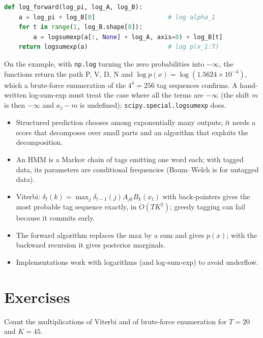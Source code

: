 \begin{notechapter}
\begin{lstlisting}[language=Python]
def log_forward(log_pi, log_A, log_B):
    a = log_pi + log_B[0]                    # log alpha_1
    for t in range(1, log_B.shape[0]):
        a = logsumexp(a[:, None] + log_A, axis=0) + log_B[t]
    return logsumexp(a)                      # log p(x_1:T)
\end{lstlisting}
On the example, with \texttt{np.log} turning the zero probabilities into $-\infty$, the functions return
the path P, V, D, N and $\log p(x) = \log(1.5624\times10^{-4})$, which a brute-force enumeration of the $4^4 = 256$ tag
sequences confirms. A hand-written log-sum-exp must treat the case where all the terms are
$-\infty$ (the shift $m$ is then $-\infty$ and $a_j - m$ is undefined); \texttt{scipy.special.logsumexp} does.

\begin{chaptersummary}
\begin{itemize}
  \item Structured prediction chooses among exponentially many outputs; it needs a score that
        decomposes over small parts and an algorithm that exploits the decomposition.
  \item An HMM is a Markov chain of tags emitting one word each; with tagged data, its parameters
        are conditional frequencies (Baum--Welch is for untagged data).
  \item Viterbi: $\delta_t(k) = \max_j\delta_{t-1}(j)A_{jk}B_k(x_t)$ with back-pointers gives the most probable tag sequence exactly, in
        $O(TK^2)$; greedy tagging can fail because it commits early.
  \item The forward algorithm replaces the max by a sum and gives $p(x)$; with the backward recursion it
        gives posterior marginals.
  \item Implementations work with logarithms (and log-sum-exp) to avoid underflow.
\end{itemize}
\end{chaptersummary}

\section*{Exercises}

\begin{exercise}\label{hmm-viterbi:exr:1}
Count the multiplications of Viterbi and of brute-force enumeration for $T = 20$ and $K = 45$.
\end{exercise}


\end{notechapter}
